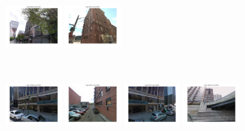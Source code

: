 \begin{figure}[h]
\begin{minipage}{0.75\linewidth}
\begin{minipage}{\linewidth}
                \colorbox{myRed}{\includegraphics[trim = 35mm 30mm 35mm 30mm, clip=true, height=16mm]{imgs/Pval/exMix09/mixPval03.jpg}}
                \colorbox{myGreen}{\includegraphics[trim = 35mm 30mm 35mm 30mm, clip=true, height=16mm]{imgs/Pval/exMix09/mixPval04.jpg}}
            \end{minipage}
            \\
            \begin{minipage}{\linewidth}
                \colorbox{myRed}{\includegraphics[trim = 35mm 30mm 35mm 30mm, clip=true, height=16mm]{imgs/Pval/exMix09/mix01.jpg}}
                \colorbox{myGreen}{\includegraphics[trim = 35mm 30mm 35mm 30mm, clip=true, height=16mm]{imgs/Pval/exMix09/mix02.jpg}}
                \colorbox{myRed}{\includegraphics[trim = 35mm 30mm 35mm 30mm, clip=true, height=16mm]{imgs/Pval/exMix09/mix03.jpg}}
                \colorbox{myRed}{\includegraphics[trim = 35mm 30mm 35mm 30mm, clip=true, height=16mm]{imgs/Pval/exMix09/mix04.jpg}}
            \end{minipage} 
        \end{minipage}
        \vspace{3mm}
        \\
        \begin{minipage}{0.34\linewidth}

\end{minipage}
\end{figure}
